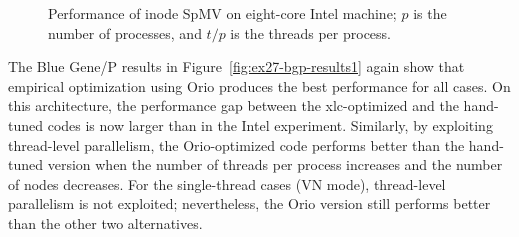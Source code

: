 \begin{figure} [ht]
\begin{center} 
    
\end{center}
\vspace{-.2in} 
\caption{Performance of inode SpMV on eight-core Intel machine; $p$ is the number of processes, and $t/p$ is the threads per process.} 
\label{fig:ex27-cookie-results} 
\end{figure} 

The Blue Gene/P results in Figure~\ref{fig:ex27-bgp-results1} again show
that empirical optimization using Orio produces the best performance for
all cases. 
On this architecture, the performance gap between the xlc-optimized and the
hand-tuned codes is now larger than in the Intel experiment. Similarly, by
exploiting thread-level parallelism, the Orio-optimized code performs better
than the hand-tuned version when the number of threads per process increases
and the number of nodes decreases. For the single-thread cases (VN mode),
thread-level parallelism is not exploited; nevertheless, the Orio version
still performs better than the other two alternatives.

